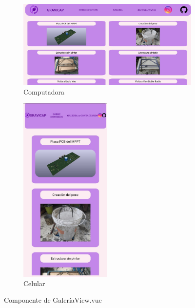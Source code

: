                     \begin{figure} [H]
                    \centering
                    \begin{subfigure}{0.5\textwidth}
                        \centering
                        \includegraphics[width=\textwidth]{Página Web/Computadora/Galería.png}
                        \caption{Computadora}
                        \label{fig:pw4.1}
                    \end{subfigure}
                    \hfill
                    \begin{subfigure}{0.4\textwidth}
                        \centering
                        \includegraphics[width=0.5\textwidth]{Página Web/Celular/Galería.png}
                        \caption{Celular}
                        \label{fig:pw4.2}
                    \end{subfigure}
                    \hfill
                            
                    \caption{Componente de GaleríaView.vue}
                    \label{fig:pw4}
                    \end{figure}

